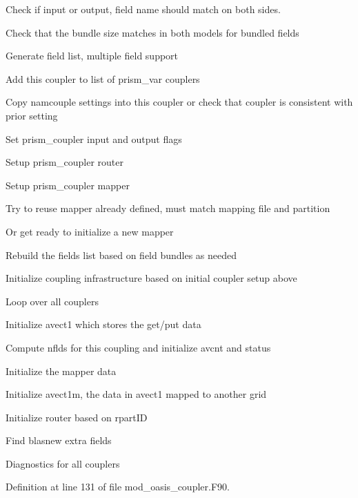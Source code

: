 \begin{DoxyItemize}
\begin{DoxyItemize}
\begin{DoxyItemize}
\begin{DoxyItemize}
\item Check if input or output, field name should match on both sides.
\item Check that the bundle size matches in both models for bundled fields
\item Generate field list, multiple field support
\item Add this coupler to list of prism\+\_\+var couplers
\item Copy namcouple settings into this coupler or check that coupler is consistent with prior setting
\item Set prism\+\_\+coupler input and output flags
\item Setup prism\+\_\+coupler router
\item Setup prism\+\_\+coupler mapper
\item Try to reuse mapper already defined, must match mapping file and partition
\item Or get ready to initialize a new mapper
\end{DoxyItemize}
\end{DoxyItemize}
\end{DoxyItemize}
\item Rebuild the fields list based on field bundles as needed
\item Initialize coupling infrastructure based on initial coupler setup above
\item Loop over all couplers
\begin{DoxyItemize}
\item Initialize avect1 which stores the get/put data
\item Compute nflds for this coupling and initialize avcnt and status
\item Initialize the mapper data
\item Initialize avect1m, the data in avect1 mapped to another grid
\item Initialize router based on rpart\+ID
\item Find blasnew extra fields
\end{DoxyItemize}
\item Diagnostics for all couplers 
\end{DoxyItemize}

Definition at line 131 of file mod\+\_\+oasis\+\_\+coupler.\+F90.

\mbox{\label{namespacemod__oasis__coupler_ad8c9a74a349ea4420ac38e2da2dc3cd2}} 
